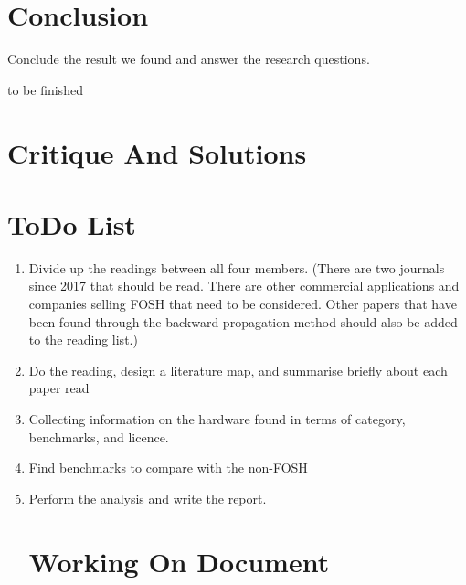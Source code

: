\documentclass[acmtog]{acmart}
\begin{document}
\section{Conclusion}
Conclude the result we found and answer the research questions.
\nocite{*}
\printbibliography


\begin{acks}
to be finished
\end{acks}




\appendix

\section{Critique And Solutions}

\section{ToDo List}
\begin{enumerate}
\item Divide up the readings between all four members. (There are two journals since 2017 that should be read. 
There are other commercial applications and companies selling FOSH that need to be considered. Other papers that have been found through the backward propagation method should also be added to the reading list.)
\item Do the reading, design a literature map, and summarise briefly about each paper read
\item Collecting information on the hardware found in terms of category, benchmarks, and licence. 
\item Find benchmarks to compare with the non-FOSH
\item Perform the analysis and write the report.

\section{Working On Document}
\label{sec:C}
\end{enumerate}
\end{document}
